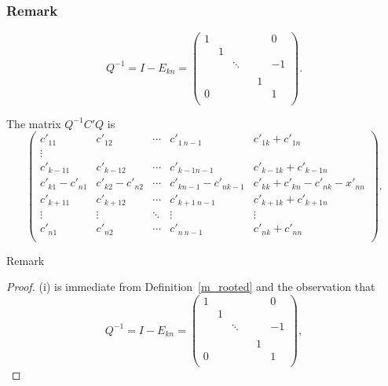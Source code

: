 \documentclass{beamer}
\theoremstyle{plain}
\theoremstyle{definition}
\begin{document}
\begin{frame}
    \frametitle{Remark}

    $$Q^{-1}=I-E_{kn}=\begin{pmatrix}
    1 &  & & &  & 0 \\
    & 1 &  &      &  &  \\
    &  & \ddots & &  & -1 \\
    &  &        & &  &  \\
    &  & & & 1 &  \\
    0 &  & & &  & 1 \\
    \end{pmatrix}.$$

    The matrix $Q^{-1}C'Q$ is
    $$\begin{pmatrix}
    c'_{11}     & c'_{12} & \cdots     & c'_{1\ n-1} & c'_{1k}+c'_{1n} \\
    \vdots \\
    c'_{k-11}     & c'_{k-1 2}           & \cdots     & c'_{k-1 n-1} & c'_{k-1k}+c'_{k-1n} \\
    c'_{k1}-c'_{n1} & c'_{k2}-c'_{n2} &\cdots      &c'_{kn-1}-c'_{nk-1}& c'_{kk}+c'_{kn}-c'_{nk}-x'_{nn}\\
    c'_{k+11}     & c'_{k+12}           & \cdots     & c'_{k+1\ n-1} & c'_{k+1k}+c'_{k+1n} \\
    \vdots              & \vdots & \ddots              & \vdots & \vdots \\
    c'_{n1}             & c'_{n2} & \cdots             & c'_{n\ n-1} & c'_{nk}+c'_{nn} \\
    \end{pmatrix}.
    $$
\end{frame}

\begin{frame}{Remark}

	\begin{proof}
        (i) is immediate from Definition~\ref{m_rooted} and the observation that   
        $$Q^{-1}=I-E_{kn}=\begin{pmatrix}
        1 &  & & &  & 0 \\
         & 1 &  &      &  &  \\
         &  & \ddots & &  & -1 \\
         &  &        & &  &  \\
          &  & & & 1 &  \\
        0 &  & & &  & 1 \\
        \end{pmatrix},$$
    \end{proof}
    
\end{frame}
\end{document}
